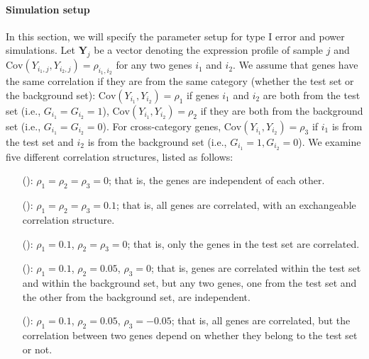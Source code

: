 	\paragraph{Simulation setup}\label{subsection:simulation}
	In this section, we will specify the parameter setup for type I error and power simulations. 
	Let $\bm Y_{j}$ be a vector denoting the expression profile of sample $j$ and 
	$\text{Cov}(Y_{i_1, j}, Y_{i_2, j})=\rho_{i_1,i_2}$ for any two genes $i_1$ and $i_2$. 
	We assume that genes have the same correlation if they are from the same category (whether the 
	test set or the background set): $\text{Cov}(Y_{i_1}, Y_{i_2})= \rho_1$ if
	genes $i_1$ and $i_2$ are both from the test set (i.e., $G_{i_1} = G_{i_2}=1$), 
	$\text{Cov}(Y_{i_1}, Y_{i_2}) =\rho_2$ if they are both from the background set (i.e., $G_{i_1} 
	=
	G_{i_2}=0$). For cross-category genes,  $\text{Cov}(Y_{i_1}, Y_{i_2})= \rho_3$ if $i_1$ is from 
	the test set and 
	$i_2$ is
	from the background set (i.e., $G_{i_1} =1,  G_{i_2}=0$). We examine five different correlation
	structures, listed as follows:
	
	\begin{enumerate}
		\item[(\aaCase):] $\rho_1 = \rho_2 = \rho_3 = 0$; that is, the genes are independent of each
		other.
		\item[(\cCase):] $\rho_1 = \rho_2 = \rho_3 = 0.1$; that is, all genes are correlated, with 
		an exchangeable correlation structure. 
		\item[(\aCase):] $\rho_1 = 0.1$, $\rho_2 = \rho_3 = 0$; that is, only the genes in the test 
		set are correlated.%
		\item[(\eCase):] $\rho_1 = 0.1$, $\rho_2 = 0.05$, $\rho_3 = 0$; that is, 
		genes are correlated within the test set and within the background set, but any two genes, 
		one from the test set and the other from the background set, are independent.
		\item[(\fCase):] $\rho_1 = 0.1$, $\rho_2 = 0.05$, $\rho_3 = -0.05$; that is, all genes are
		correlated, but the correlation between two genes depend on whether they belong to the test 
		set or not.
	\end{enumerate}
	
